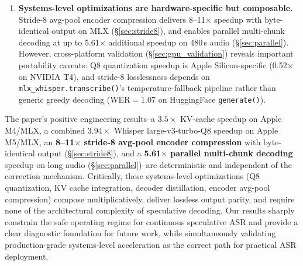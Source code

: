 \documentclass[11pt,a4paper]{article}
\begin{document}
\begin{enumerate}[leftmargin=*,itemsep=4pt]
    \item \textbf{Systems-level optimizations are hardware-specific but composable.}
    Stride-8 avg-pool encoder compression delivers 8--11$\times$ speedup with byte-identical output on MLX (\S\ref{sec:stride8}), and enables parallel multi-chunk decoding at up to 5.61$\times$ additional speedup on 480\,s audio (\S\ref{sec:parallel}). However, cross-platform validation (\S\ref{sec:gpu_validation}) reveals important portability caveats: Q8 quantization speedup is Apple Silicon-specific (0.52$\times$ on NVIDIA T4), and stride-8 losslessness depends on \texttt{mlx\_whisper.transcribe()}'s temperature-fallback pipeline rather than generic greedy decoding (WER$=$1.07 on HuggingFace \texttt{generate()}).
\end{enumerate}

\noindent The paper's positive engineering results--a $3.5\times$ KV-cache speedup on Apple M4/MLX, a combined $3.94\times$ Whisper large-v3-turbo-Q8 speedup on Apple M5/MLX, an \textbf{8--11$\times$ stride-8 avg-pool encoder compression} with byte-identical output (\S\ref{sec:stride8}), and a \textbf{5.61$\times$ parallel multi-chunk decoding} speedup on long audio (\S\ref{sec:parallel})--are deterministic and independent of the correction mechanism. Critically, these systems-level optimizations (Q8 quantization, KV cache integration, decoder distillation, encoder avg-pool compression) compose multiplicatively, deliver lossless output parity, and require none of the architectural complexity of speculative decoding.
Our results sharply constrain the safe operating regime for continuous speculative ASR and provide a clear diagnostic foundation for future work, while simultaneously validating production-grade systems-level acceleration as the correct path for practical ASR deployment.
\end{document}
